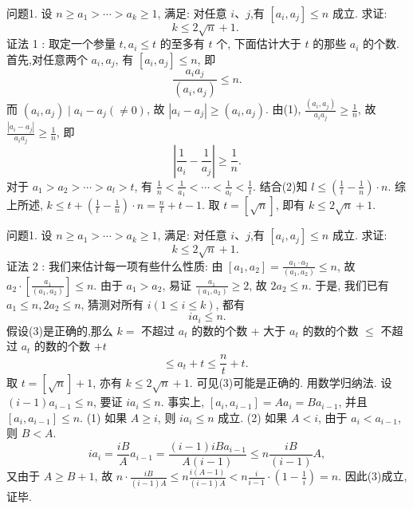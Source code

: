 
问题1. 设 $n \geqslant a_1>\cdots>a_k \geqslant 1$, 满足: 对任意 $i 、 j$,有 $\left[a_i, a_j\right] \leqslant n$ 成立.
求证:
$$
k \leqslant 2 \sqrt{n}+1 \text {. }
$$
证法 1 : 取定一个参量 $t, a_i \leqslant t$ 的至多有 $t$ 个, 下面估计大于 $t$ 的那些 $a_i$ 的个数.
首先,对任意两个 $a_i, a_j$, 有 $\left[a_i, a_j\right] \leqslant n$, 即
$$
\frac{a_i a_j}{\left(a_i, a_j\right)} \leqslant n . \label{(1)}
$$
而 $\left(a_i, a_j\right) \mid a_i-a_j(\neq 0)$, 故 $\left|a_i-a_j\right| \geqslant\left(a_i, a_j\right)$.
由(1), $\frac{\left(a_i, a_j\right)}{a_i a_j} \geqslant \frac{1}{n}$, 故 $\frac{\left|a_i-a_j\right|}{a_i a_j} \geqslant \frac{1}{n}$, 即
$$
\left|\frac{1}{a_i}-\frac{1}{a_j}\right| \geqslant \frac{1}{n} . \label{(2)}
$$
对于 $a_1>a_2>\cdots>a_l>t$, 有 $\frac{1}{n}<\frac{1}{a_1}<\cdots<\frac{1}{a_l}<\frac{1}{t}$.
结合(2)知 $l \leqslant\left(\frac{1}{t}-\frac{1}{n}\right) \cdot n$.
综上所述, $k \leqslant t+\left(\frac{1}{t}-\frac{1}{n}\right) \cdot n=\frac{n}{t}+t-1$.
取 $t=[\sqrt{n}]$, 即有 $k \leqslant 2 \sqrt{n}+1$.



问题1. 设 $n \geqslant a_1>\cdots>a_k \geqslant 1$, 满足: 对任意 $i 、 j$,有 $\left[a_i, a_j\right] \leqslant n$ 成立.
求证:
$$
k \leqslant 2 \sqrt{n}+1 \text {. }
$$
证法 2 : 我们来估计每一项有些什么性质:
由 $\left[a_1, a_2\right]=\frac{a_1 \cdot a_2}{\left(a_1, a_2\right)} \leqslant n$, 故 $a_2 \cdot\left[\frac{a_1}{\left(a_1, a_2\right)}\right] \leqslant n$.
由于 $a_1>a_2$, 易证 $\frac{a_1}{\left(a_1, a_2\right)} \geqslant 2$, 故 $2 a_2 \leqslant n$.
于是, 我们已有 $a_1 \leqslant n, 2 a_2 \leqslant n$, 猜测对所有 $i(1 \leqslant i \leqslant k)$, 都有
$$
i a_i \leqslant n . \label{(3)}
$$
假设(3)是正确的,那么
$k=$ 不超过 $a_t$ 的数的个数 + 大于 $a_t$ 的数的个数
$\leqslant$ 不超过 $a_t$ 的数的个数 $+t$
$$
\leqslant a_t+t \leqslant \frac{n}{t}+t \text {. }
$$
取 $t=[\sqrt{n}]+1$, 亦有 $k \leqslant 2 \sqrt{n}+1$. 可见(3)可能是正确的.
用数学归纳法.
设 $(i-1) a_{i-1} \leqslant n$, 要证 $i a_i \leqslant n$.
事实上, $\left[a_i, a_{i-1}\right]=A a_i=B a_{i-1}$, 并且 $\left[a_i, a_{i-1}\right] \leqslant n$.
(1) 如果 $A \geqslant i$, 则 $i a_i \leqslant n$ 成立.
(2) 如果 $A<i$, 由于 $a_i<a_{i-1}$, 则 $B<A$.
$$
i a_i=\frac{i B}{A} a_{i-1}=\frac{(i-1) i B a_{i-1}}{A(i-1)} \leqslant n \frac{i B}{(i-1)} A,
$$
又由于 $A \geqslant B+1$, 故 $n \cdot \frac{i B}{(i-1) A} \leqslant n \frac{i(A-1)}{(i-1) A}<n \frac{i}{i-1} \cdot\left(1-\frac{1}{i}\right)=n$.
因此(3)成立,证毕.



